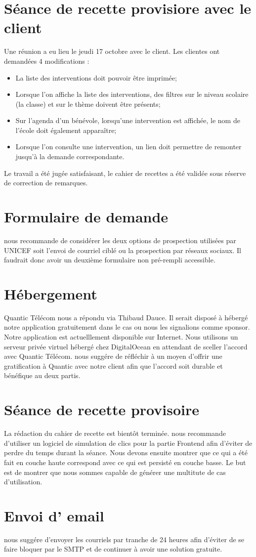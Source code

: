 \documentclass [a4paper] {article}
\begin{document}
\section{Séance de recette provisiore avec le client}
Une réunion a eu lieu le jeudi 17 octobre avec le client. Les clientes ont demandées 4 modifications : 
\begin{itemize}
	\item	La liste des interventions doit pouvoir être imprimée;
	\item	Lorsque l'on affiche la liste des interventions, des filtres sur le niveau scolaire (la classe) et sur le thème doivent être présents;
	\item	Sur l'agenda d'un bénévole, lorsqu'une intervention est affichée, le nom de l'école doit également apparaître;
	\item	Lorsque l'on consulte une intervention, un lien doit permettre de remonter jusqu'à la demande correspondante.
\end{itemize} 
Le travail a été jugée satisfaisant, le cahier de recettes a été validée sous réserve de correction de remarques.

\section{Formulaire de demande}
\nomTuteurPedago{} nous recommande de considérer les deux options de prospection utilisées par UNICEF soit l'envoi de courriel ciblé ou la prospection par réseaux sociaux. 
Il faudrait donc avoir un deuxième formulaire non pré-rempli accessible.

\section{Hébergement}
Quantic Télécom nous a répondu via Thibaud Dauce. Il serait disposé à hébergé notre application gratuitement dans le cas ou nous les signalions comme sponsor. Notre application est actuelllement disponible sur Internet. Nous utilisons un serveur privée virtuel hébergé chez DigitalOcean en attendant de sceller l'accord avec Quantic Télécom. \nomTuteurPedago{} nous suggére de réfléchir à un moyen d'offrir une gratification à Quantic avec notre client afin que l'accord soit durable et bénéfique au deux partis.

\section{Séance de recette provisoire}
La rédaction du cahier de recette est bientôt terminée. \nomTuteurPedago{} nous recommande d'utiliser un logiciel de simulation de clics pour la partie Frontend afin d'éviter de perdre du temps durant la séance. Nous devons ensuite montrer que ce qui a été fait en couche haute correspond avec ce qui est persisté en couche basse. Le but est de montrer que nous sommes capable de générer une multitute de cas d'utilisation.

\section{Envoi d' email}
\nomTuteurPedago{} nous suggére d'envoyer les courriels par tranche de 24 heures afin d'éviter de se faire bloquer par le SMTP et de continuer à avoir une solution gratuite.
\newpage
\end{document}
